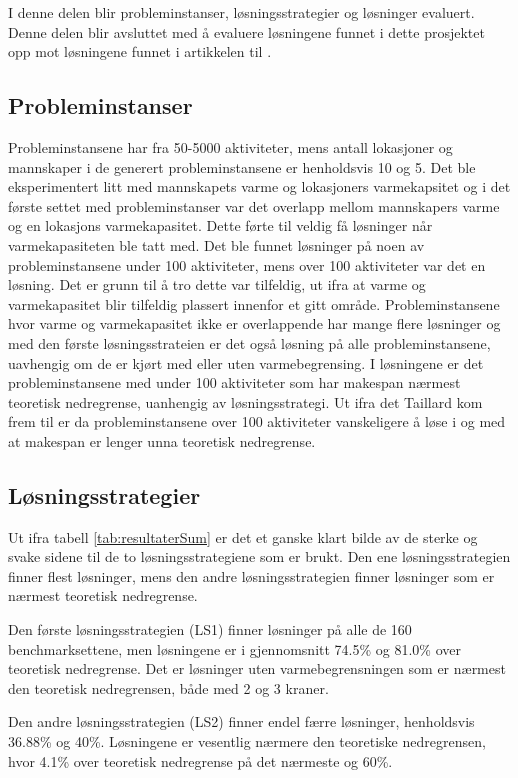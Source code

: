 I denne delen blir probleminstanser, løsningsstrategier og løsninger evaluert. Denne delen blir avsluttet med å evaluere løsningene funnet i dette prosjektet opp mot løsningene funnet i artikkelen til \bht.

\subsection{Probleminstanser}
Probleminstansene har fra 50-5000 aktiviteter, mens antall lokasjoner og mannskaper i de generert probleminstansene er henholdsvis 10 og 5. Det ble eksperimentert litt med mannskapets varme og lokasjoners varmekapsitet og i det første settet med probleminstanser var det overlapp mellom mannskapers varme og en lokasjons varmekapasitet. Dette førte til veldig få løsninger når varmekapasiteten ble tatt med. Det ble funnet løsninger på noen av probleminstansene under 100 aktiviteter, mens over 100 aktiviteter var det en løsning. Det er grunn til å tro dette var tilfeldig, ut ifra at varme og varmekapasitet blir tilfeldig plassert innenfor et gitt område. Probleminstansene hvor varme og varmekapasitet ikke er overlappende har mange flere løsninger og med den første løsningsstrateien er det også løsning på alle probleminstansene, uavhengig om de er kjørt med eller uten varmebegrensing. I løsningene er det probleminstansene med under 100 aktiviteter som har makespan nærmest teoretisk nedregrense, uanhengig av løsningsstrategi. Ut ifra det Taillard \cite{Taillard1993278} kom frem til er da probleminstansene over 100 aktiviteter vanskeligere å løse i og med at makespan er lenger unna teoretisk nedregrense.

\subsection{Løsningsstrategier}
Ut ifra tabell \ref{tab:resultaterSum} er det et ganske klart bilde av de sterke og svake sidene til de to løsningsstrategiene som er brukt. Den ene løsningsstrategien finner flest løsninger, mens den andre løsningsstrategien finner løsninger som er nærmest teoretisk nedregrense.

Den første løsningsstrategien (LS1) finner løsninger på alle de 160 benchmarksettene, men løsningene er i gjennomsnitt 74.5\% og 81.0\% over teoretisk nedregrense. Det er løsninger uten varmebegrensningen som er nærmest den teoretisk nedregrensen, både med 2 og 3 kraner.

Den andre løsningsstrategien (LS2) finner endel færre løsninger, henholdsvis 36.88\% og 40\%. Løsningene er vesentlig nærmere den teoretiske nedregrensen, hvor 4.1\% over teoretisk nedregrense på det nærmeste og 60\%.

